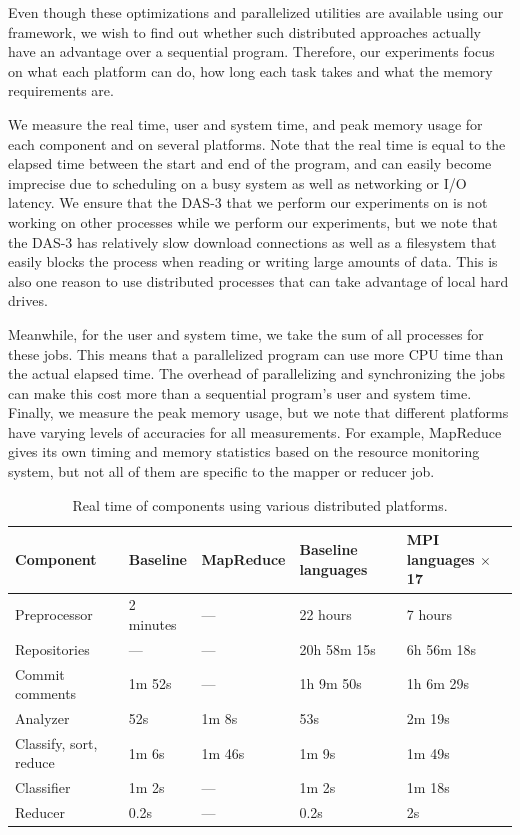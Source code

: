 \documentclass{article}
\begin{document}
Even though these optimizations and parallelized utilities are available using 
our framework, we wish to find out whether such distributed approaches actually 
have an advantage over a sequential program. Therefore, our experiments focus 
on what each platform can do, how long each task takes and what the memory 
requirements are.

We measure the real time, user and system time, and peak memory usage for each 
component and on several platforms. Note that the real time is equal to the 
elapsed time between the start and end of the program, and can easily become 
imprecise due to scheduling on a busy system as well as networking or I/O 
latency. We ensure that the DAS-3 that we perform our experiments on is not 
working on other processes while we perform our experiments, but we note that 
the DAS-3 has relatively slow download connections as well as a filesystem that 
easily blocks the process when reading or writing large amounts of data. This 
is also one reason to use distributed processes that can take advantage of 
local hard drives.

Meanwhile, for the user and system time, we take the sum of all processes for 
these jobs. This means that a parallelized program can use more CPU time than 
the actual elapsed time. The overhead of parallelizing and synchronizing the 
jobs can make this cost more than a sequential program's user and system time. 
Finally, we measure the peak memory usage, but we note that different platforms 
have varying levels of accuracies for all measurements. For example, MapReduce 
gives its own timing and memory statistics based on the resource monitoring 
system, but not all of them are specific to the mapper or reducer job.

\begin{table}[h!]
  \centering
  \begin{tabular}{l l l l l}
    \toprule
    \textbf{Component} & \textbf{Baseline} & \textbf{MapReduce} &
    \textbf{Baseline languages} & \textbf{MPI languages $\times$ 17} \\
    \midrule
    Preprocessor           & 2 minutes & ---    & 22 hours    & 7 hours    \\
    \quad Repositories     & ---       & ---    & 20h 58m 15s & 6h 56m 18s \\
    \quad Commit comments  & 1m 52s    & ---    & 1h 9m 50s   & 1h 6m 29s  \\
    Analyzer               & 52s       & 1m 8s  & 53s         & 2m 19s     \\
    Classify, sort, reduce & 1m 6s     & 1m 46s & 1m 9s       & 1m 49s     \\
    \quad Classifier       & 1m 2s     & ---    & 1m 2s       & 1m 18s     \\
    \quad Reducer          & 0.2s      & ---    & 0.2s        & 2s         \\
    \bottomrule
  \end{tabular}
  \caption{Real time of components using various distributed platforms.}
  \label{tab:component-real-time}
\end{table}
\end{document}
